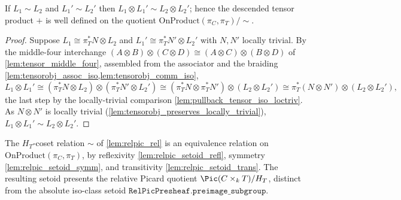\begin{lemma}\leanok
  \label{lem:relpic_add_welldef}
  If \(L_1 \sim L_2\) and \(L_1' \sim L_2'\) then
  \(L_1 \otimes L_1' \sim L_2 \otimes L_2'\); hence the descended tensor product
  \(+\) is well defined on the quotient
  \(\mathrm{OnProduct}(\pi_C, \pi_T) / {\sim}\).
\end{lemma}

\begin{proof}
  Suppose \(L_1 \cong \pi_T^* N \otimes L_2\) and
  \(L_1' \cong \pi_T^* N' \otimes L_2'\) with \(N, N'\) locally trivial. By the
  middle-four interchange
  \((A \otimes B) \otimes (C \otimes D) \cong (A \otimes C) \otimes (B \otimes D)\)
  of \cref{lem:tensor_middle_four}, assembled from the associator and the
  braiding \cref{lem:tensorobj_assoc_iso,lem:tensorobj_comm_iso},
  \[
    L_1 \otimes L_1'
      \cong (\pi_T^* N \otimes L_2) \otimes (\pi_T^* N' \otimes L_2')
      \cong (\pi_T^* N \otimes \pi_T^* N') \otimes (L_2 \otimes L_2')
      \cong \pi_T^*(N \otimes N') \otimes (L_2 \otimes L_2') ,
  \]
  the last step by the locally-trivial comparison
  \cref{lem:pullback_tensor_iso_loctriv}. As \(N \otimes N'\) is locally
  trivial (\cref{lem:tensorobj_preserves_locally_trivial}),
  \(L_1 \otimes L_1' \sim L_2 \otimes L_2'\).
\leanok
\end{proof}

\begin{definition}
  \label{lem:relpic_setoid}
  The \(H_T\)-coset relation \(\sim\) of \cref{lem:relpic_rel} is an equivalence
  relation on \(\mathrm{OnProduct}(\pi_C, \pi_T)\), by reflexivity
  \cref{lem:relpic_setoid_refl}, symmetry \cref{lem:relpic_setoid_symm}, and
  transitivity \cref{lem:relpic_setoid_trans}. The resulting setoid presents the
  relative Picard quotient \(\Pic(C \times_k T) / H_T\), distinct from the
  absolute iso-class setoid \(\mathtt{RelPicPresheaf.preimage\_subgroup}\).
\end{definition}

